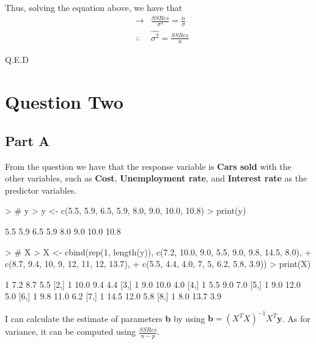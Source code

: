 \documentclass{article}
\begin{document}
\noindent Thus, solving the equation above, we have that
\begin{eqnarray*}
    &\rightarrow& \frac{SSRes}{\sigma^3} = \frac{n}{\sigma} \\
    &\therefore& \hat{\sigma^2} = \frac{SSRes}{n}
\end{eqnarray*}

\begin{flushright}
Q.E.D
\end{flushright}

\newpage
\section{Question Two}

\subsection{Part A}
From the question we have that the response variable is \textbf{Cars sold} with the other variables, such as \textbf{Cost}, \textbf{Unemployment rate}, and \textbf{Interest rate} as the predictor variables.

\begin{Schunk}
\begin{Sinput}
> # y
> y <- c(5.5, 5.9, 6.5, 5.9, 8.0, 9.0, 10.0, 10.8)
> print(y)
\end{Sinput}
\begin{Soutput}
[1]  5.5  5.9  6.5  5.9  8.0  9.0 10.0 10.8
\end{Soutput}
\begin{Sinput}
> # X
> X <- cbind(rep(1, length(y)), c(7.2, 10.0, 9.0, 5.5, 9.0, 9.8, 14.5, 8.0), 
+            c(8.7, 9.4, 10, 9, 12, 11, 12, 13.7), 
+            c(5.5, 4.4, 4.0, 7, 5, 6.2, 5.8, 3.9))
> print(X)
\end{Sinput}
\begin{Soutput}
     [,1] [,2] [,3] [,4]
[1,]    1  7.2  8.7  5.5
[2,]    1 10.0  9.4  4.4
[3,]    1  9.0 10.0  4.0
[4,]    1  5.5  9.0  7.0
[5,]    1  9.0 12.0  5.0
[6,]    1  9.8 11.0  6.2
[7,]    1 14.5 12.0  5.8
[8,]    1  8.0 13.7  3.9
\end{Soutput}
\end{Schunk}

\noindent I can calculate the estimate of parameters \textbf{b} by using $\textbf{b} = (X^TX)^{-1}X^T\textbf{y}$. As for variance, it can be computed using $\frac{SSRes}{n-p}.$
\end{document}
